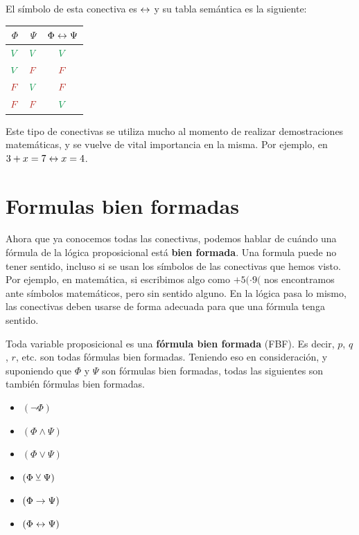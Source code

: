El símbolo de esta conectiva es $\leftrightarrow$ y su tabla semántica es la siguiente:

\begin{tabular}{ c | c | c }
    \textbf{$\Phi$} & \textbf{$\Psi$} & \textbf{$\Phi \leftrightarrow \Psi$}\\
    \hline
    $\ltrue$  & $\ltrue$  & $\ltrue$  \\
    $\ltrue$  & $\lfalse$ & $\lfalse$ \\
    $\lfalse$ & $\ltrue$  & $\lfalse$ \\
    $\lfalse$ & $\lfalse$ & $\ltrue$  \\
\end{tabular}

Este tipo de conectivas se utiliza mucho al momento de realizar demostraciones
matemáticas, y se vuelve de vital importancia en la misma. Por ejemplo, en $3 +
x = 7 \leftrightarrow x = 4$.

\section{Formulas bien formadas}
\label{chap:logica_proposicional:sec:fbf}

Ahora que ya conocemos todas las conectivas, podemos hablar de cuándo una
fórmula de la lógica proposicional está \textbf{bien formada}. Una formula puede
no tener sentido, incluso si se usan los símbolos de las conectivas que hemos
visto. Por ejemplo, en matemática, si escribimos algo como \textit{$+5(\cdot
9($} nos encontramos ante símbolos matemáticos, pero sin sentido alguno. En la
lógica pasa lo mismo, las conectivas deben usarse de forma adecuada para que una
fórmula tenga sentido.

Toda variable proposicional es una \textbf{fórmula bien formada} (FBF). Es
decir, $p$, $q$, $r$, etc. son todas fórmulas bien formadas. Teniendo eso en
consideración, y suponiendo que $\Phi$ y $\Psi$ son fórmulas bien formadas,
todas las siguientes son también fórmulas bien formadas.
\begin{itemize}
    \item $(\lnot \Phi)$
    \item $(\Phi \land \Psi)$
    \item $(\Phi \lor \Psi)$
    \item $(\Phi \veebar \Psi)$
    \item $(\Phi \to \Psi)$
    \item $(\Phi \leftrightarrow \Psi)$
\end{itemize}


